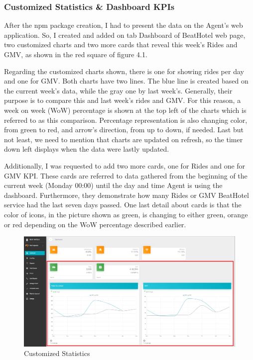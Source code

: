 \subsubsection{Customized Statistics \& Dashboard KPIs}
After the npm package creation, I had to present the data on the Agent's web application. So, I created and added on tab Dashboard of BeatHotel web page, two customized charts and two more cards that reveal this week's Rides and GMV, as shown in the red square of figure 4.1.   \par
Regarding the customized charts shown, there is one for showing rides per day and one for GMV. Both charts have two lines. The blue line is created based on the current week's data, while the gray one by last week's. Generally, their purpose is to compare this and last week's rides and GMV. For this reason, a week on week (WoW) percentage is shown at the top left of the charts which is referred to as this comparison. Percentage representation is also changing color, from green to red, and arrow's direction, from up to down, if needed. Last but not least, we need to mention that charts are updated on refresh, so the timer down left displays when the data were lastly updated. \par 
Additionally, I was requested to add two more cards, one for Rides and one for GMV KPI. These cards are referred to data gathered from the beginning of the current week (Monday 00:00) until the day and time Agent is using the dashboard. Furthermore, they demonstrate how many Rides or GMV BeatHotel service had the last seven days passed. One last detail about cards is that the color of icons, in the picture shown as green, is changing to either green, orange or red depending on the WoW percentage described earlier. \par

\begin{figure}[H]
	\begin{center}
		\includegraphics[scale=0.45]{images/my_projects/Statistics/feature-dashboard-statistics.png}
	\end{center}
	\caption{Customized Statistics}
\end{figure}

